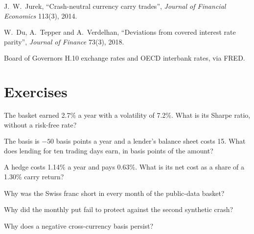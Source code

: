 \begin{omsources}
\item J.~W.~Jurek, ``Crash-neutral currency carry trades'', \emph{Journal of Financial Economics} 113(3), 2014.
\item W.~Du, A.~Tepper and A.~Verdelhan, ``Deviations from covered interest rate parity'', \emph{Journal of Finance} 73(3), 2018.
\item Board of Governors H.10 exchange rates and OECD interbank rates, via FRED.
\end{omsources}

\section{Exercises}

\begin{exercise}[$\star$]\label{exo:s2:cross-currency-basis-and-fx-carry:1}
The basket earned 2.7\% a year with a volatility of 7.2\%. What is its Sharpe ratio, without a risk-free rate?
\end{exercise}

\begin{exercise}[$\star$]\label{exo:s2:cross-currency-basis-and-fx-carry:2}
The basis is $-50$ basis points a year and a lender's balance sheet costs 15. What does lending for ten trading days earn, in basis points of the
amount?
\end{exercise}

\begin{exercise}[$\star$]\label{exo:s2:cross-currency-basis-and-fx-carry:3}
A hedge costs 1.14\% a year and pays 0.63\%. What is its net cost as a share of a 1.30\% carry return?
\end{exercise}

\begin{exercise}[$\star\star$]\label{exo:s2:cross-currency-basis-and-fx-carry:4}
Why was the Swiss franc short in every month of the public-data basket?
\end{exercise}

\begin{exercise}[$\star\star$]\label{exo:s2:cross-currency-basis-and-fx-carry:5}
Why did the monthly put fail to protect against the second synthetic crash?
\end{exercise}

\begin{exercise}[$\star\star$]\label{exo:s2:cross-currency-basis-and-fx-carry:6}
Why does a negative cross-currency basis persist?
\end{exercise}

